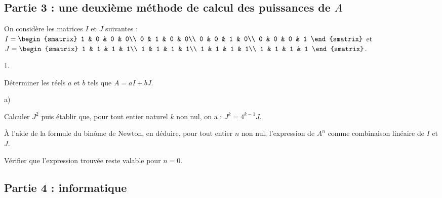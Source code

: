 \documentclass[11pt]{article}%
\begin{document}
\subsection*{Partie 3 : une deuxième méthode de calcul des puissances
  de $A$}

\noindent
On considère les matrices $I$ et $J$ suivantes : $I =
\begin{smatrix}
  1 & 0 & 0 & 0\\
  0 & 1 & 0 & 0\\
  0 & 0 & 1 & 0\\
  0 & 0 & 0 & 1
\end{smatrix}
$ et $J = 
\begin{smatrix}
  1 & 1 & 1 & 1\\
  1 & 1 & 1 & 1\\
  1 & 1 & 1 & 1\\
  1 & 1 & 1 & 1
\end{smatrix}
$.
\begin{noliste}{1.}
  \setlength{\itemsep}{4mm}%
 \setcounter{enumi}{8}
\item Déterminer les réels $a$ et $b$ tels que $A = aI + bJ$.
\item
  \begin{noliste}{a)}
    \setlength{\itemsep}{2mm}
  \item Calculer $J^{2}$ puis établir que, pour tout entier naturel
    $k$ non nul, on a : $J^{k} = 4^{k-1} J$.
  \item À l'aide de la formule du binôme de Newton, en déduire, pour tout
    entier $n$ non nul, l'expression de $A^{n}$ comme combinaison linéaire
    de $I$ et $J$.
  \item Vérifier que l'expression trouvée reste valable pour $n = 0$.
  \end{noliste}
  
\end{noliste}


\subsection*{Partie 4 : informatique}
\end{document}
